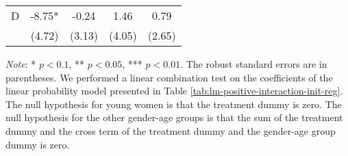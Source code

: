 \documentclass[12pt, a4paper]{article}
\begin{document}
\begin{table}[H]
\begin{threeparttable}
\begin{tabular}[t]{lcccc}
\hspace{1em}D & -8.75* & -0.24 & 1.46 & 0.79\\
\hspace{1em} & (4.72) & (3.13) & (4.05) & (2.65)\\
\bottomrule
\end{tabular}
\begin{tablenotes}
\item \emph{Note}: * $p < 0.1$, ** $p < 0.05$, *** $p < 0.01$. The robust standard errors are in parentheses. We performed a linear combination test on the coefficients of the linear probability model presented in Table \ref{tab:lm-positive-interaction-init-reg}. The null hypothesis for young women is that the treatment dummy is zero. The null hypothesis for the other gender-age groups is that the sum of the treatment dummy and the cross term of the treatment dummy and the gender-age group dummy is zero.
\end{tablenotes}
\end{threeparttable}
\end{table}
\end{document}

